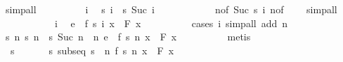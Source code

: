 \documentclass{article}
\theoremstyle{definition}
\begin{document}
\begin{isabellebody}
\ simp{\isacharunderscore}all\isanewline
\ \ \ \ \ \ \isacommand{{\isacharbraceleft}}\isamarkupfalse%
\ \isamarkupfalse%
\ i\ \isamarkupfalse%
\ {\isachardoublequoteopen}s\ i\ {\isacharless}\ s\ {\isacharparenleft}Suc\ i{\isacharparenright}{\isachardoublequoteclose}\isanewline
\ \ \ \ \ \ \ \ \ \ \isamarkupfalse%
\ n{\isacharparenleft}{}{\isacharparenright}{\isacharbrackleft}of\ {\isachardoublequoteopen}Suc\ {\isacharparenleft}s\ i{\isacharparenright}{\isachardoublequoteclose}{\isacharbrackright}\ n{\isacharparenleft}{}{\isacharparenright}{\isacharbrackleft}of\ {}{\isacharbrackright}\ \ \isamarkupfalse%
\ simp{\isacharunderscore}all\ \isacommand{{\isacharbraceright}}\isamarkupfalse%
\isanewline
\ \ \ \ \ \ \isamarkupfalse%
\ \isacommand{{\isacharbraceleft}}\isamarkupfalse%
\ \isamarkupfalse%
\ i\ \isamarkupfalse%
\ {\isachardoublequoteopen}e\ {\isasymle}\ {\isasymbar}f\ {\isacharparenleft}s\ i{\isacharparenright}\ x\ {\isacharminus}\ F\ x{\isasymbar}{\isachardoublequoteclose}\isanewline
\ \ \ \ \ \ \ \ \isamarkupfalse%
\ {\isacharparenleft}cases\ i{\isacharparenright}\ {\isacharparenleft}simp{\isacharunderscore}all\ add{\isacharcolon}\ n{\isacharparenright}\ \isacommand{{\isacharbraceright}}\isamarkupfalse%
\isanewline
\ \ \ \ \ \ \isamarkupfalse%
\ \isamarkupfalse%
\ {\isachardoublequoteopen}{\isasymexists}s{\isachardot}\ {\isacharparenleft}{\isasymforall}n{\isachardot}\ s\ n\ {\isacharless}\ s\ {\isacharparenleft}Suc\ n{\isacharparenright}{\isacharparenright}\ {\isasymand}\ {\isacharparenleft}{\isasymforall}n{\isachardot}\ e\ {\isasymle}\ {\isasymbar}f\ {\isacharparenleft}s\ n{\isacharparenright}\ x\ {\isacharminus}\ F\ x{\isasymbar}{\isacharparenright}{\isachardoublequoteclose}\isanewline
\ \ \ \ \ \ \ \ \isamarkupfalse%
\ metis\isanewline
\ \ \ \ \isamarkupfalse%
\isanewline
\ \ \isamarkupfalse%
\ \isamarkupfalse%
\ {\isasymepsilon}\ s\ \ {\isasymepsilon}{\isacharcolon}\ {\isachardoublequoteopen}{\isasymepsilon}\ {\isachargreater}\ {}{\isachardoublequoteclose}\ \ s{\isacharcolon}\ {\isachardoublequoteopen}subseq\ s\ {\isasymand}\ {\isacharparenleft}{\isasymforall}n{\isachardot}\ {\isasymbar}f\ {\isacharparenleft}s\ n{\isacharparenright}\ x\ {\isacharminus}\ F\ x{\isasymbar}\ {\isasymge}\ {\isasymepsilon}{\isacharparenright}{\isachardoublequoteclose}\ \isamarkupfalse%

\end{isabellebody}
\end{document}
